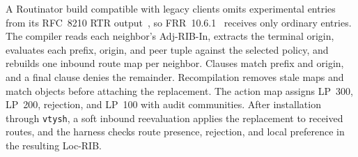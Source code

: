 A Routinator build compatible with legacy clients omits experimental entries from its RFC~8210 RTR output~\cite{rfc8210}, so FRR~10.6.1~\cite{frr} receives only ordinary entries. The compiler reads each neighbor's Adj-RIB-In, extracts the terminal origin, evaluates each prefix, origin, and peer tuple against the selected policy, and rebuilds one inbound route map per neighbor. Clauses match prefix and origin, and a final clause denies the remainder. Recompilation removes stale maps and match objects before attaching the replacement. The action map assigns \explicit{} LP~300, \openscope{} LP~200, \invalid{} rejection, and \notfound{} LP~100 with audit communities. After installation through \texttt{vtysh}, a soft inbound reevaluation applies the replacement to received routes, and the harness checks route presence, rejection, and local preference in the resulting Loc-RIB.
